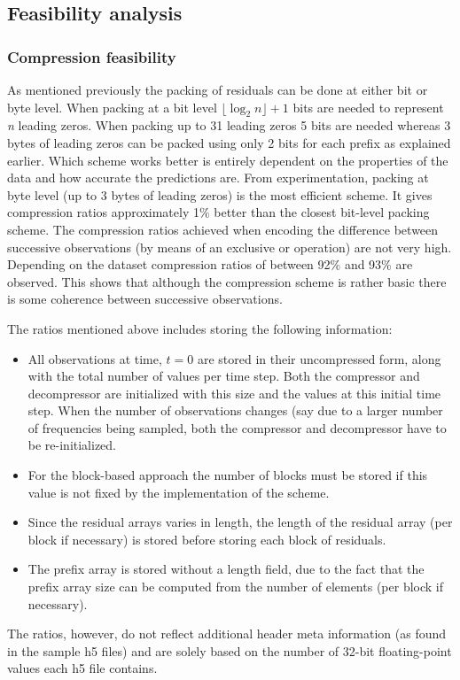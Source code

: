  \subsection{Feasibility analysis}
  \subsubsection{Compression feasibility}
  As mentioned previously the packing of residuals can be done at either bit or byte level. When packing at a bit level $\lfloor\log_2n\rfloor + 1$ bits are needed to represent
  \textit{n} leading zeros. When packing up to 31 leading zeros 5 bits are needed whereas 3 bytes of leading zeros can be packed using only 2 bits for each prefix as explained earlier. Which scheme
  works better is entirely dependent on the properties of the data and how accurate the predictions are. From experimentation, packing at byte level (up to 3 bytes of leading zeros) is the most 
  efficient scheme. It gives compression ratios approximately 1\% better than the closest bit-level packing scheme. The compression ratios achieved when encoding the
  difference between successive observations (by means of an exclusive or operation) are not very high. Depending on the dataset compression ratios of between 92\% and 93\% are observed. This shows that 
  although the compression scheme is rather basic there is some coherence between successive observations. 
  
  The ratios mentioned above includes storing the following information:
  \begin{itemize}
   \item All observations at time, $t=0$ are stored in their uncompressed form, along with the total number of values per time step. Both the compressor and decompressor are 
   initialized with this size and the values at this initial time step. When the number of observations changes (say due to a larger number of frequencies being sampled, both the
   compressor and decompressor have to be re-initialized.
   \item For the block-based approach the number of blocks must be stored if this value is not fixed by the implementation of the scheme.
   \item Since the residual arrays varies in length, the length of the residual array (per block if necessary) is stored before storing each block of residuals.
   \item The prefix array is stored without a length field, due to the fact that the prefix array size can be computed from the number of elements (per block if necessary).
  \end{itemize}
  The ratios, however, do not reflect additional header meta information (as found in the sample h5 files) and are solely based on the number of 32-bit floating-point values each
  h5 file contains. 
